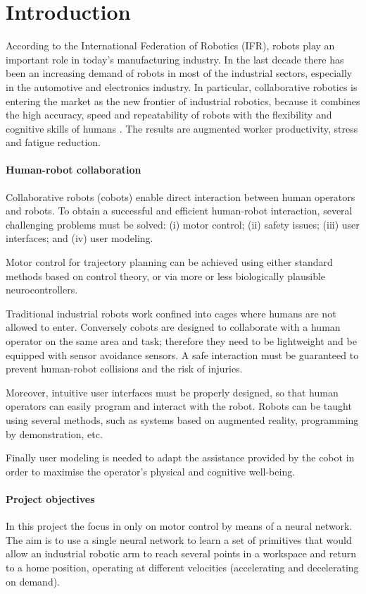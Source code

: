\documentclass[10pt,a4paper, final]{report} %
\begin{document}
\section{Introduction}
According to the International Federation of Robotics (IFR), robots play an important role in today's manufacturing industry. In the last decade there has been an increasing demand of robots in most of the industrial sectors, especially in the automotive and electronics industry. In particular, collaborative robotics is entering the market as the new frontier of industrial robotics, because it combines the high accuracy, speed and repeatability of robots with the flexibility and cognitive skills of humans \cite{villani2018survey}. The results are augmented worker productivity, stress and fatigue reduction.

\paragraph{Human-robot collaboration}
Collaborative robots (cobots) enable direct interaction between human operators and robots.
To obtain a successful and efficient human-robot interaction, several challenging problems must be solved: (i) motor control; (ii) safety issues; (iii) user interfaces; and (iv) user modeling.

Motor control for trajectory planning can be achieved using either standard methods based on control theory, or via more or less biologically plausible neurocontrollers.

Traditional industrial robots work confined into cages where humans are not allowed to enter. Conversely cobots are designed to collaborate with a human operator on the same area and task; therefore they need to be lightweight and be equipped with sensor avoidance sensors. A safe interaction must be guaranteed to prevent human-robot collisions and the risk of injuries.

Moreover, intuitive user interfaces must be properly designed, so that human operators can easily program and interact with the robot. Robots can be taught using several methods, such as systems based on augmented reality, programming by demonstration, etc.

Finally user modeling is needed to adapt the assistance provided by the cobot in order to maximise the operator's physical and cognitive well-being.


\paragraph{Project objectives}
In this project the focus in only on motor control by means of a neural network. The aim is to use a single neural network to learn a set of primitives that would allow an industrial robotic arm to reach several points in a workspace and return to a home position, operating at different velocities (accelerating and decelerating on demand).
\end{document}

